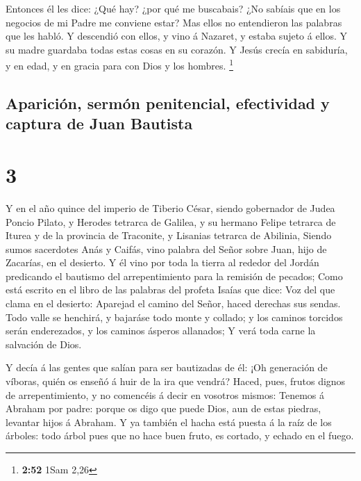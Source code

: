  Entonces él les dice: ¿Qué hay? ¿por qué me buscabais? ¿No
sabíais que en los negocios de mi Padre me conviene estar? 
Mas ellos no entendieron las palabras que les habló.  Y
descendió con ellos, y vino á Nazaret, y estaba sujeto á ellos. Y su
madre guardaba todas estas cosas en su corazón.  Y Jesús
crecía en sabiduría, y en edad, y en gracia para con Dios y los hombres.
\footnote{\textbf{2:52} 1Sam 2,26}

\hypertarget{apariciuxf3n-sermuxf3n-penitencial-efectividad-y-captura-de-juan-bautista}{%
\subsection{Aparición, sermón penitencial, efectividad y captura de Juan
Bautista}\label{apariciuxf3n-sermuxf3n-penitencial-efectividad-y-captura-de-juan-bautista}}

\hypertarget{section-2}{%
\section{3}\label{section-2}}

 Y en el año quince del imperio de Tiberio César, siendo
gobernador de Judea Poncio Pilato, y Herodes tetrarca de Galilea, y su
hermano Felipe tetrarca de Iturea y de la provincia de Traconite, y
Lisanias tetrarca de Abilinia,  Siendo sumos sacerdotes Anás
y Caifás, vino palabra del Señor sobre Juan, hijo de Zacarías, en el
desierto.  Y él vino por toda la tierra al rededor del
Jordán predicando el bautismo del arrepentimiento para la remisión de
pecados;  Como está escrito en el libro de las palabras del
profeta Isaías que dice: Voz del que clama en el desierto: Aparejad el
camino del Señor, haced derechas sus sendas.  Todo valle se
henchirá, y bajaráse todo monte y collado; y los caminos torcidos serán
enderezados, y los caminos ásperos allanados;  Y verá toda
carne la salvación de Dios.

 Y decía á las gentes que salían para ser bautizadas de él:
¡Oh generación de víboras, quién os enseñó á huir de la ira que vendrá?
 Haced, pues, frutos dignos de arrepentimiento, y no
comencéis á decir en vosotros mismos: Tenemos á Abraham por padre:
porque os digo que puede Dios, aun de estas piedras, levantar hijos á
Abraham.  Y ya también el hacha está puesta á la raíz de los
árboles: todo árbol pues que no hace buen fruto, es cortado, y echado en
el fuego.

